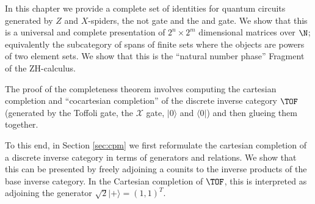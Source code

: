 

In this chapter we provide a complete set of identities for quantum circuits generated by $Z$ and $X$-spiders, the not gate and the {\sf and} gate. We show that this is a universal and complete presentation of $2^n \times 2^m$ dimensional matrices over $\N$; equivalently the subcategory of spans of finite sets where the objects are powers of two element sets. We show that this is the ``natural number phase'' Fragment of the ZH-calculus.



The proof of the completeness theorem involves computing the cartesian completion and ``cocartesian completion'' of the discrete inverse category $\TOF$ (generated by the Toffoli gate, the $\mathcal X$ gate,  $|0\rangle$ and $\langle 0|$) and then glueing them together.

To this end, in Section \ref{sec:cpm} we first reformulate the cartesian completion of a discrete inverse category in terms of generators and relations.  We show that this can be presented by freely adjoining a counits to the inverse products of the base inverse category.   In the Cartesian completion of $\TOF$, this is interpreted as adjoining the generator $\sqrt 2 | + \rangle=(1,1)^T$.

